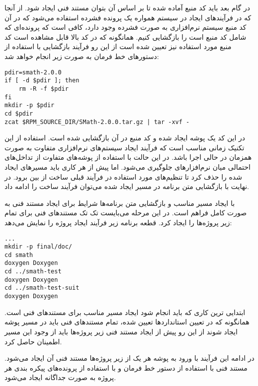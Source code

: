 در گام بعد باید کد منبع آماده شده تا بر اساس آن  بتوان مستند فنی ایجاد شود. از
آنجا که در فرآیندهای ایجاد در سیستم  همواره یک پرونده فشرده استفاده
می‌شود که در آن کد منبع سیستم نرم‌افزاری به صورت فشرده وجود دارد، کافی است که
پرونده‌ای که شامل کد منبع است را بازگشایی کنیم. همانگونه که در کد بالا قابل
مشاهده است کد منبع مورد استفاده نیز تعیین شده است از این رو فرآیند بازگشایی با
استفاده از دستورهای خط فرمان به صورت زیر انجام خواهد شد:

\begin{latin}
\lstset{language=TeX}  
\begin{lstlisting}[frame=single]
pdir=smath-2.0.0
if [ -d $pdir ]; then
	rm -R -f $pdir
fi
mkdir -p $pdir
cd $pdir
zcat $RPM_SOURCE_DIR/SMath-2.0.0.tar.gz | tar -xvf -
\end{lstlisting}
\end{latin}

در این کد یک پوشه ایجاد شده و کد منبع در آن بازگشایی شده است. استفاده از این
تکنیک زمانی مناسب است که فرآیند ایجاد سیستم‌های نرم‌افزاری متفاوت به صورت همزمان
در حالی اجرا باشد. در این حالت با استفاده از پوشه‌های متفاوت از تداخل‌های
احتمالی میان نرم‌افزارهای جلوگیری می‌شود. اما پیش از هر کاری باید مسیرهای ایجاد
شده را حذف کرد تا تنظیم‌های مورد استفاده در فرآیند قبلی ساخت از بین برود. در
نهایت با بازگشایی متن برنامه در مسیر ایجاد شده می‌توان فرآیند ساخت را ادامه داد.

با ایجاد مسیر مناسب و بازگشایی متن برنامه‌ها شرایط برای ایجاد مستند فنی به صورت
کامل فراهم است. در این مرحله می‌بایست تک تک مستند‌های فنی برای تمام زیر پروژه‌ها
را ایجاد کرد. قطعه برنامه زیر فرآیند ایجاد پروژه را نمایش می‌دهد: 

\begin{latin}
\lstset{language=TeX}  
\begin{lstlisting}[frame=single] 
...
mkdir -p final/doc/
cd smath
doxygen Doxygen
cd ../smath-test
doxygen Doxygen
cd ../smath-test-suit
doxygen Doxygen
\end{lstlisting}
\end{latin}

ابتدایی ترین کاری که باید انجام شود ایجاد مسیر مناسب برای مستند‌های فنی است.
همانگونه که در تعیین استانداردها تعیین شده، تمام مستند‌های فنی باید در مسیر پوشه
 ایجاد شوند از این رو پیش از ایجاد مستند فنی زیر پروژه‌ها باید از
وجود این مسیر اطمینان حاصل کرد.

در ادامه این فرآیند با ورود به پوشه هر یک از زیر پروژه‌ها مستند فنی آن ایجاد
می‌شود. مستند فنی با استفاده از دستور خط فرمان  و با استفاده
از پرونده‌های پیکره بندی هر پروژه به صورت جداگانه ایجاد می‌شود. 

